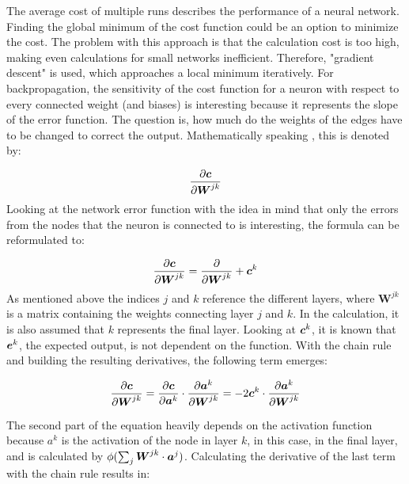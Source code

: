 The average cost of multiple runs describes the performance of a neural network. 
Finding the global minimum of the cost function could be an option to minimize the cost. The problem with this approach is that the calculation cost is too high, making even calculations for small networks inefficient. Therefore, "gradient descent" is used, which approaches a local minimum iteratively. For backpropagation, the sensitivity of the cost function for a neuron with respect to every connected weight (and biases) is interesting because it represents the slope of the error function. The question is, how much do the weights of the edges have to be changed to correct the output. Mathematically speaking \cite{zhang2023dive}, this is denoted by:

\begin{equation}
\frac{\partial{\boldsymbol{c}}}{\partial{\boldsymbol{W}^{jk}}}
\end{equation}
Looking at the network error function with the idea in mind that only the errors from the nodes that the neuron is connected to is interesting, the formula can be reformulated to: 

\begin{equation}
\frac{\partial{\boldsymbol{c}}}{\partial{\boldsymbol{W}^{jk}}} = \frac{\partial}{\partial{\boldsymbol{W}^{jk}}} +  \boldsymbol{c}^k
\end{equation}
As mentioned above the indices $j$ and $k$ reference the different layers, where $\boldsymbol{W}^{jk}$ is a matrix containing the weights connecting layer $j$ and $k$. In the calculation, it is also assumed that $k$ represents the final layer. Looking at $\boldsymbol{c}^k$, it is known that $\boldsymbol{e}^k$, the expected output, is not dependent on the function. With the chain rule and building the resulting derivatives, the following term emerges:

\begin{equation}
\frac{\partial{\boldsymbol{c}}}{\partial{\boldsymbol{W}^{jk}}} = \frac{\partial{\boldsymbol{c}}}{\partial{\boldsymbol{a}^k}}
\cdot \frac{\partial{\boldsymbol{a}^k}}{\partial{\boldsymbol{W}^{jk}}} = -2\boldsymbol{c}^k \cdot \frac{\partial{\boldsymbol{a}^k}}{\partial{\boldsymbol{W}^{jk}}}
\end{equation}

The second part of the equation heavily depends on the activation function because $a^k$ is the activation of the node in layer $k$, in this case, in the final layer, and is calculated by $\phi(\sum_j \boldsymbol{W}^{jk} \cdot \boldsymbol{a}^j)$. Calculating the derivative of the last term with the chain rule results in:

